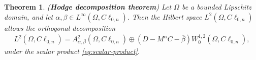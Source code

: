\documentclass[10pt,a4paper]{amsart}
\newtheorem{theorem}{Theorem}
\newcommand{\comment}[1]{\marginpar{\hfuzz=5ex
\scriptsize$\stackrel{?}{\longleftarrow}$\\\hspace*{-3ex}
{\fbox{\parbox{20ex}{\hfuzz=15ex \raggedright\sf#1 }}} }}
\begin{document}
\begin{theorem}\label{th:Hodge-decomposition}(\textbf{Hodge decomposition theorem})
Let $\Omega$ be a bounded Lipschitz domain, and let $\alpha, \beta\in L^{\infty}(\Omega,C\ell_{0,n})$.
Then the Hilbert space $L^2(\Omega,C\ell_{0,n})$ allows the orthogonal decomposition
\begin{align}\label{eq:Hodge-2}  L^2(\Omega,C\ell_{0,n})=A_{\alpha,\beta}^2(\Omega,C\ell_{0,n})\oplus (D-M^{\alpha}C-\overline{\beta}) W_0^{1,2}(\Omega,C\ell_{0,n}),
\end{align} 
under the scalar product \eqref{eq:scalar-product}.
\end{theorem}
\end{document}
